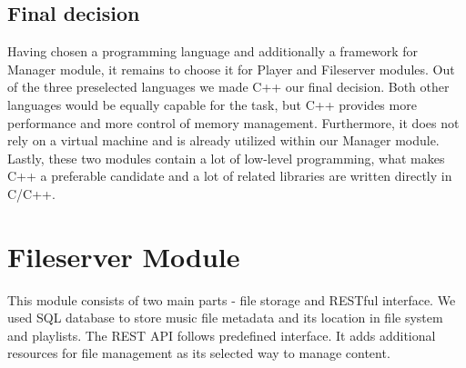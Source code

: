 \subsection{Final decision}

Having chosen a programming language and additionally a framework for Manager module, it remains to choose it for Player and Fileserver modules. Out of the three preselected languages we made C++ our final decision.
Both other languages would be equally capable for the task, but C++ provides more performance and more control of memory management. Furthermore, it does not rely on a virtual machine and is already utilized within our Manager module. Lastly, these two modules contain a lot of low-level programming, what makes C++ a preferable candidate and a lot of related libraries are written directly in C/C++.

\section{Fileserver Module}

This module consists of two main parts - file storage and RESTful interface. We used SQL database to store music file metadata and its location in file system and playlists. The REST API follows predefined interface. It adds additional resources for file management as its selected way to manage content.

